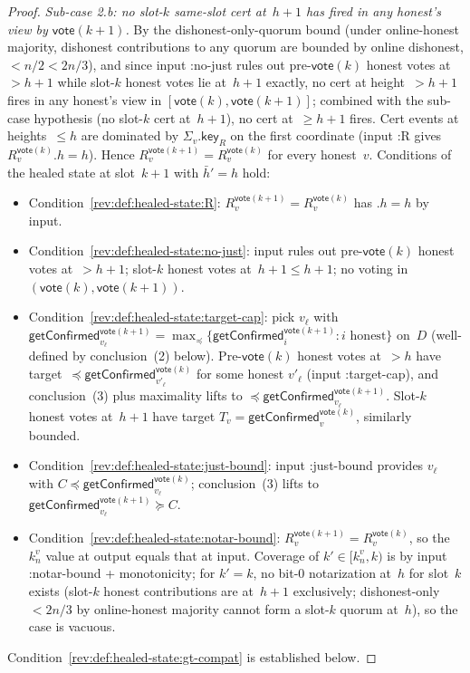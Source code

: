 \documentclass{article}
\newcommand{\key}{\mathsf{key}}
\newcommand{\vote}{\mathsf{vote}}
\newcommand{\comm}[1]{\bar{#1}}
\newcommand{\getConfirmed}{\textsf{getConfirmed}\xspace}
\theoremstyle{plain}
\theoremstyle{definition}
\theoremstyle{remark}
\newcommand{\OHM}{online-honest majority\xspace}
\begin{document}
\begin{proof}
\emph{Sub-case 2.b: no slot-$k$ same-slot cert at~$h+1$ has fired in any honest's view by $\vote(k+1)$.}
By the dishonest-only-quorum bound (under \OHM, dishonest contributions to any quorum are bounded by online dishonest, $<n/2 < 2n/3$), and since input :no-just rules out pre-$\vote(k)$ honest votes at~$>h+1$ while slot-$k$ honest votes lie at~$h+1$ exactly, no cert at height~$>h+1$ fires in any honest's view in $[\vote(k),\vote(k+1)]$; combined with the sub-case hypothesis (no slot-$k$ cert at~$h+1$), no cert at~$\geq h+1$ fires. Cert events at heights~$\leq h$ are dominated by $\Sigma_v.\key_R$ on the first coordinate (input :R gives $R_v^{\vote(k)}.h = h$). Hence $R_v^{\vote(k+1)} = R_v^{\vote(k)}$ for every honest~$v$. Conditions of the healed state at slot~$k+1$ with $\comm{h}' = h$ hold:
\begin{itemize}
  \item Condition~\ref{rev:def:healed-state:R}: $R_v^{\vote(k+1)} = R_v^{\vote(k)}$ has $.h = h$ by input.
  \item Condition~\ref{rev:def:healed-state:no-just}: input rules out pre-$\vote(k)$ honest votes at~$>h+1$; slot-$k$ honest votes at~$h+1 \leq h+1$; no voting in $(\vote(k),\vote(k+1))$.
  \item Condition~\ref{rev:def:healed-state:target-cap}: pick $v_\ell$ with $\getConfirmed_{v_\ell}^{\vote(k+1)} = \max_\preceq \{\getConfirmed_i^{\vote(k+1)} : i \text{ honest}\}$ on~$D$ (well-defined by conclusion~(2) below). Pre-$\vote(k)$ honest votes at~$>h$ have target~$\preceq \getConfirmed_{v'_\ell}^{\vote(k)}$ for some honest $v'_\ell$ (input :target-cap), and conclusion~(3) plus maximality lifts to $\preceq \getConfirmed_{v_\ell}^{\vote(k+1)}$. Slot-$k$ honest votes at~$h+1$ have target $T_v = \getConfirmed_v^{\vote(k)}$, similarly bounded.
  \item Condition~\ref{rev:def:healed-state:just-bound}: input :just-bound provides $v_\ell$ with $C \preceq \getConfirmed_{v_\ell}^{\vote(k)}$; conclusion~(3) lifts to $\getConfirmed_{v_\ell}^{\vote(k+1)} \succeq C$.
  \item Condition~\ref{rev:def:healed-state:notar-bound}: $R_v^{\vote(k+1)} = R_v^{\vote(k)}$, so the $k_n^v$ value at output equals that at input. Coverage of $k' \in [k_n^v, k)$ is by input :notar-bound + monotonicity; for $k' = k$, no bit-$0$ notarization at~$h$ for slot~$k$ exists (slot-$k$ honest contributions are at~$h+1$ exclusively; dishonest-only $<2n/3$ by \OHM cannot form a slot-$k$ quorum at~$h$), so the case is vacuous.
\end{itemize}
Condition~\ref{rev:def:healed-state:gt-compat} is established below.


\end{proof}
\end{document}
